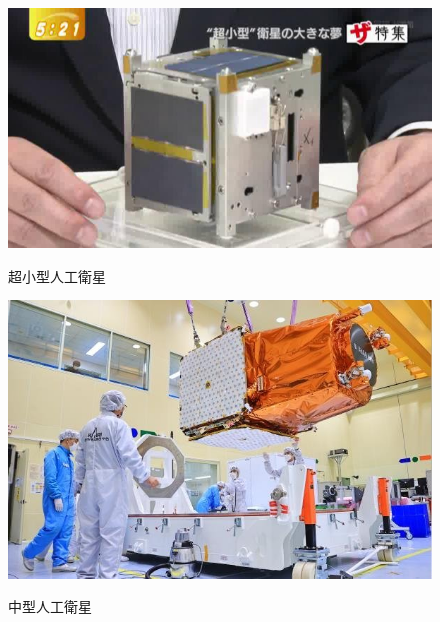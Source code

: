 \begin{figure}[H]
    \centering
    \begin{minipage}[b]{0.47\columnwidth}
        \centering
        \includegraphics[width=0.9\columnwidth]{./figure/超小型.jpg}
        \caption{超小型人工衛星}
        \label{fig:a}
        \vfill
        \includegraphics[width=0.9\columnwidth]{./figure/中型.jpg}
        \caption{中型人工衛星}
        \label{fig:b}
    \end{minipage}
    \begin{minipage}[b]{0.51\columnwidth}
        \centering

\end{minipage}
\end{figure}
